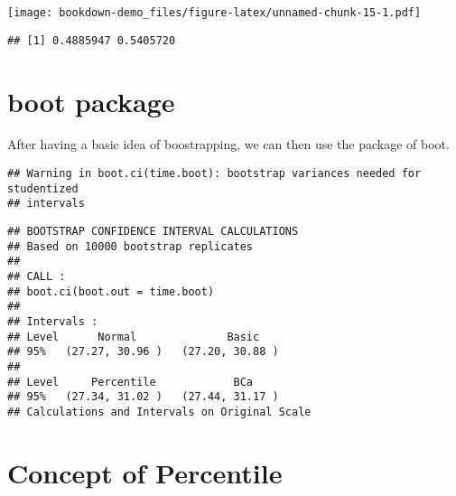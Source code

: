 \documentclass[]{book}
\newenvironment{Shaded}{\begin{snugshade}}{\end{snugshade}}
\newcommand{\ControlFlowTok}[1]{\textcolor[rgb]{0.13,0.29,0.53}{\textbf{#1}}}
\newcommand{\DecValTok}[1]{\textcolor[rgb]{0.00,0.00,0.81}{#1}}
\newcommand{\KeywordTok}[1]{\textcolor[rgb]{0.13,0.29,0.53}{\textbf{#1}}}
\newcommand{\NormalTok}[1]{#1}
\newcommand{\OperatorTok}[1]{\textcolor[rgb]{0.81,0.36,0.00}{\textbf{#1}}}
\newcommand{\StringTok}[1]{\textcolor[rgb]{0.31,0.60,0.02}{#1}}
\begin{document}
\texttt{[image: bookdown-demo\_files/figure-latex/unnamed-chunk-15-1.pdf]}

\begin{verbatim}
## [1] 0.4885947 0.5405720
\end{verbatim}

\hypertarget{boot-package}{%
\section{boot package}\label{boot-package}}

After having a basic idea of boostrapping, we can then use the package of boot.

\begin{Shaded}
\end{Shaded}

\begin{verbatim}
## Warning in boot.ci(time.boot): bootstrap variances needed for studentized
## intervals
\end{verbatim}

\begin{verbatim}
## BOOTSTRAP CONFIDENCE INTERVAL CALCULATIONS
## Based on 10000 bootstrap replicates
## 
## CALL : 
## boot.ci(boot.out = time.boot)
## 
## Intervals : 
## Level      Normal              Basic         
## 95%   (27.27, 30.96 )   (27.20, 30.88 )  
## 
## Level     Percentile            BCa          
## 95%   (27.34, 31.02 )   (27.44, 31.17 )  
## Calculations and Intervals on Original Scale
\end{verbatim}

\hypertarget{concept-of-percentile}{%
\section{Concept of Percentile}\label{concept-of-percentile}}
\end{document}

